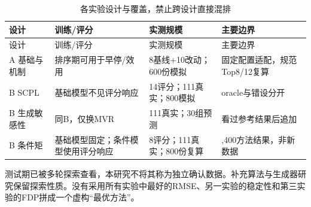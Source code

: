 \documentclass[UTF8,11pt,a4paper]{ctexart}
\begin{document}
{
\footnotesize
\begin{longtable}[]{@{}
  >{\raggedright\arraybackslash}p{}
  >{\raggedright\arraybackslash}p{}
  >{\raggedright\arraybackslash}p{}
  >{\raggedright\arraybackslash}p{}@{}}
\caption{各实验设计与覆盖，禁止跨设计直接混排}\tabularnewline
\toprule\noalign{}
\begin{minipage}[b]{\linewidth}\raggedright
设计
\end{minipage} & \begin{minipage}[b]{\linewidth}\raggedright
训练/评分
\end{minipage} & \begin{minipage}[b]{\linewidth}\raggedright
实测规模
\end{minipage} & \begin{minipage}[b]{\linewidth}\raggedright
主要边界
\end{minipage} \\
\midrule\noalign{}
\endfirsthead
\toprule\noalign{}
\begin{minipage}[b]{\linewidth}\raggedright
设计
\end{minipage} & \begin{minipage}[b]{\linewidth}\raggedright
训练/评分
\end{minipage} & \begin{minipage}[b]{\linewidth}\raggedright
实测规模
\end{minipage} & \begin{minipage}[b]{\linewidth}\raggedright
主要边界
\end{minipage} \\
\midrule\noalign{}
\endhead
\bottomrule\noalign{}
\endlastfoot
A 基础与机制 & 排序期可用于早停/效用 & 8基线+10改动；600份模拟 & 固定配置适配，规范Top8/12复算 \\
B SCPL & 基础模型不见评分响应 & 14评分；111真实；800模拟 & oracle与错设分开 \\
B 生成敏感性 & 同B，仅换MVR & 111真实；30组预测 & 看过参考结果后追加 \\
B 条件矩 & 基础模型固定；条件模型使用评分响应 & 8评分；111真实；800份复算 & 6,400方法结果，非新数据 \\
\end{longtable}
}

测试期已被多轮探索查看，本研究不将其称为独立确认数据。补充算法与生成器研究保留探索性质。没有采用所有实验中最好的RMSE、另一实验的稳定性和第三实验的FDP拼成一个虚构``最优方法''。
\end{document}
